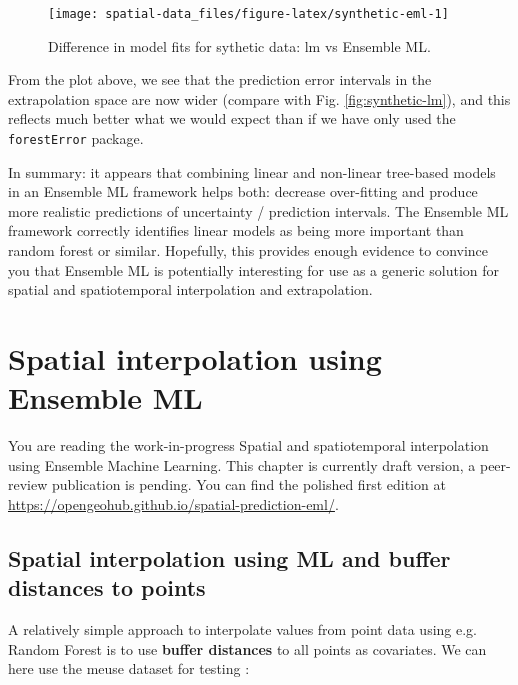 \documentclass[
  graybox,natbib,nospthms]{svmono}
\begin{document}
\begin{figure}

{\centering \texttt{[image: spatial-data\_files/figure-latex/synthetic-eml-1]} 

}

\caption{Difference in model fits for sythetic data: lm vs Ensemble ML.}\label{fig:synthetic-eml}
\end{figure}

From the plot above, we see that the prediction error intervals in the
extrapolation space are now wider (compare with Fig. \ref{fig:synthetic-lm}), and this reflects much better
what we would expect than if we have only used the \texttt{forestError} package.

In summary: it appears that combining linear and non-linear tree-based
models in an Ensemble ML framework helps both: decrease over-fitting and produce
more realistic predictions of uncertainty / prediction intervals. The Ensemble ML
framework correctly identifies linear models as being more important than
random forest or similar. Hopefully, this provides enough evidence to convince you
that Ensemble ML is potentially interesting for use as a generic solution for
spatial and spatiotemporal interpolation and extrapolation.

\hypertarget{spatial-interpolation-using-ensemble-ml}{%
\chapter{Spatial interpolation using Ensemble ML}\label{spatial-interpolation-using-ensemble-ml}}

You are reading the work-in-progress Spatial and spatiotemporal interpolation using Ensemble Machine Learning. This chapter is currently draft version, a peer-review publication is pending. You can find the polished first edition at \url{https://opengeohub.github.io/spatial-prediction-eml/}.

\hypertarget{spatial-interpolation-using-ml-and-buffer-distances-to-points}{%
\section{Spatial interpolation using ML and buffer distances to points}\label{spatial-interpolation-using-ml-and-buffer-distances-to-points}}

A relatively simple approach to interpolate values from point data using e.g.~
Random Forest is to use \textbf{buffer distances} to all points as covariates. We can
here use the meuse dataset for testing \citep{hengl2018random}:
\end{document}
